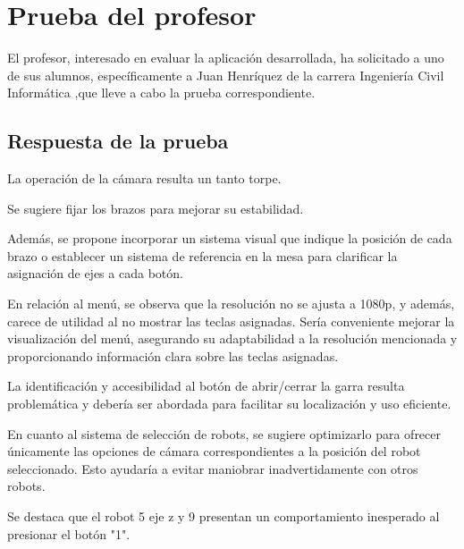 \section{Prueba del profesor}
El profesor, interesado en evaluar la aplicación desarrollada, ha solicitado a uno de sus alumnos, específicamente a Juan Henríquez de la carrera Ingeniería Civil Informática ,que lleve a cabo la prueba correspondiente. 

\subsection*{Respuesta de la prueba}
La operación de la cámara resulta un tanto torpe.

Se sugiere fijar los brazos para mejorar su estabilidad.

Además, se propone incorporar un sistema visual que indique la posición de cada brazo o establecer un sistema de referencia en la mesa para clarificar la asignación de ejes a cada botón.

En relación al menú, se observa que la resolución no se ajusta a 1080p, y además, carece de utilidad al no mostrar las teclas asignadas. Sería conveniente mejorar la visualización del menú, asegurando su adaptabilidad a la resolución mencionada y proporcionando información clara sobre las teclas asignadas.

La identificación y accesibilidad al botón de abrir/cerrar la garra resulta problemática y debería ser abordada para facilitar su localización y uso eficiente.

En cuanto al sistema de selección de robots, se sugiere optimizarlo para ofrecer únicamente las opciones de cámara correspondientes a la posición del robot seleccionado. Esto ayudaría a evitar maniobrar inadvertidamente con otros robots.

Se destaca que el robot 5 eje z y 9 presentan un comportamiento inesperado al presionar el botón "1".